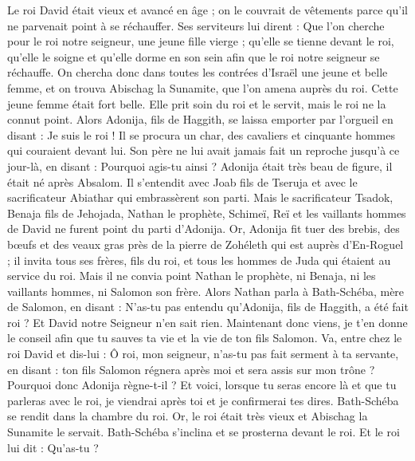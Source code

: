 \begin{multicols}{2}
\VerseOne{}Le roi David était vieux et avancé en âge ; on le couvrait de vêtements parce qu’il ne parvenait point à se réchauffer.
Ses serviteurs lui dirent : Que l'on cherche pour le roi notre seigneur, une jeune fille vierge ; qu’elle se tienne devant le roi, qu’elle le soigne et qu'elle dorme en son sein afin que le roi notre seigneur se réchauffe.
On chercha donc dans toutes les contrées d'Israël une jeune et belle femme, et on trouva Abischag la Sunamite, que l’on amena auprès du roi.
Cette jeune femme était fort belle. Elle prit soin du roi et le servit, mais le roi ne la connut point.
Alors Adonija, fils de Haggith, se laissa emporter par l’orgueil en disant : Je suis le roi ! Il se procura un char, des cavaliers et cinquante hommes qui couraient devant lui.
Son père ne lui avait jamais fait un reproche jusqu’à ce jour-là, en disant : Pourquoi agis-tu ainsi ? Adonija était très beau de figure, il était né après Absalom.
Il s’entendit avec Joab fils de Tseruja et avec le sacrificateur Abiathar qui embrassèrent son parti.
Mais le sacrificateur Tsadok, Benaja fils de Jehojada, Nathan le prophète, Schimeï, Reï et les vaillants hommes de David ne furent point du parti d'Adonija.
Or, Adonija fit tuer des brebis, des bœufs et des veaux gras près de la pierre de Zohéleth qui est auprès d’En-Roguel ; il invita tous ses frères, fils du roi, et tous les hommes de Juda qui étaient au service du roi.
Mais il ne convia point Nathan le prophète, ni Benaja, ni les vaillants hommes, ni Salomon son frère.
Alors Nathan parla à Bath-Schéba, mère de Salomon, en disant : N'as-tu pas entendu qu'Adonija, fils de Haggith, a été fait roi ? Et David notre Seigneur n'en sait rien.
Maintenant donc viens, je t’en donne le conseil afin que tu sauves ta vie et la vie de ton fils Salomon.
Va, entre chez le roi David et dis-lui : Ô roi, mon seigneur, n'as-tu pas fait serment à ta servante, en disant : ton fils Salomon régnera après moi et sera assis sur mon trône ? Pourquoi donc Adonija règne-t-il ?
Et voici, lorsque tu seras encore là et que tu parleras avec le roi, je viendrai après toi et je confirmerai tes dires.
Bath-Schéba se rendit dans la chambre du roi. Or, le roi était très vieux et Abischag la Sunamite le servait.
Bath-Schéba s'inclina et se prosterna devant le roi. Et le roi lui dit : Qu'as-tu ?

\end{multicols}
